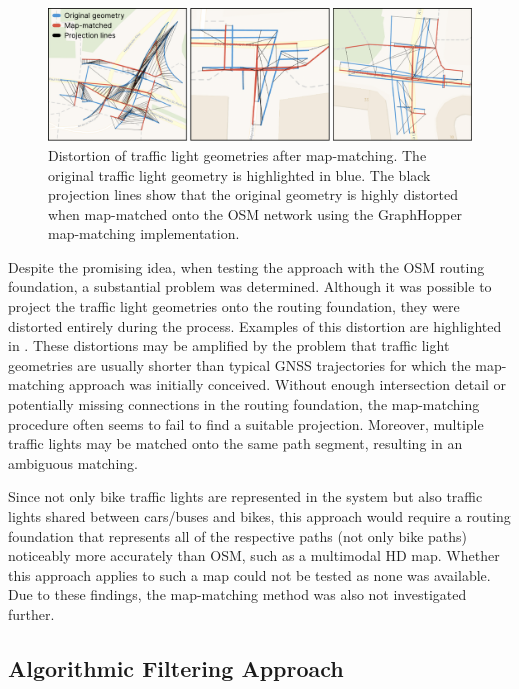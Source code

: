\begin{figure}[t]
\centering
\includegraphics[width=\linewidth]{images/sg-selection-map-matching-fails.pdf}
\caption{Distortion of traffic light geometries after map-matching. The original traffic light geometry is highlighted in blue. The black projection lines show that the original geometry is highly distorted when map-matched onto the OSM network using the GraphHopper map-matching implementation.}
\label{fig:sg-selection-map-matching-fails}
\end{figure}

Despite the promising idea, when testing the approach with the OSM routing foundation, a substantial problem was determined. Although it was possible to project the traffic light geometries onto the routing foundation, they were distorted entirely during the process. Examples of this distortion are highlighted in . These distortions may be amplified by the problem that traffic light geometries are usually shorter than typical GNSS trajectories for which the map-matching approach was initially conceived. Without enough intersection detail or potentially missing connections in the routing foundation, the map-matching procedure often seems to fail to find a suitable projection. Moreover, multiple traffic lights may be matched onto the same path segment, resulting in an ambiguous matching. 

Since not only bike traffic lights are represented in the system but also traffic lights shared between cars/buses and bikes, this approach would require a routing foundation that represents all of the respective paths (not only bike paths) noticeably more accurately than OSM, such as a multimodal HD map. Whether this approach applies to such a map could not be tested as none was available. Due to these findings, the map-matching method was also not investigated further.

\subsection{Algorithmic Filtering Approach}

